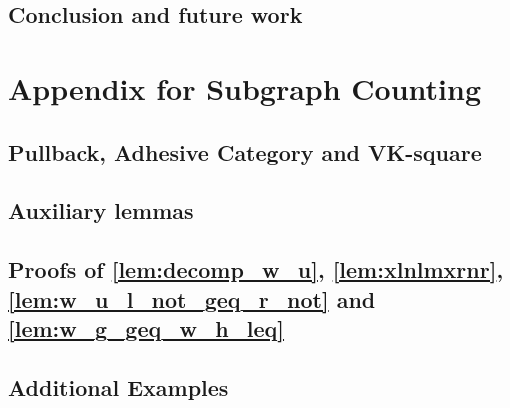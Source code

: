 \documentclass{report}
\begin{document}
\section{Conclusion and future work}
\label{sec:conclusion} 


% 
% 

\chapter*{Appendix for Subgraph Counting}
\section*{Pullback, Adhesive Category and VK-square}

\newpage
\section*{Auxiliary lemmas}

\newpage
\section{Proofs of \autoref{lem:decomp_w_u}, \autoref{lem:xlnlmxrnr}, \autoref{lem:w_u_l_not_geq_r_not} and \autoref{lem:w_g_geq_w_h_leq}}
\label{sec:appendix:a}

\section{Additional Examples}

 

\printbibliography
\end{document}
